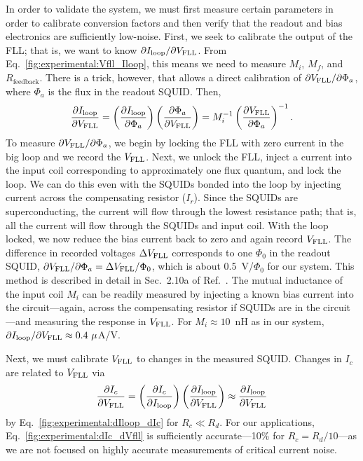 In order to validate the system, we must first measure certain parameters in order to calibrate conversion factors and then verify that the readout and bias electronics are sufficiently low-noise. First, we seek to calibrate the output of the FLL; that is, we want to know $\partial I_\text{loop}/\partial V_\text{FLL}$. From Eq.~\eqref{fig:experimental:Vfll_Iloop}, this means we need to measure $M_i$, $M_f$, and $R_{\text{feedback}}$. There is a trick, however, that allows a direct calibration of $\partial V_\text{FLL}/\partial\Phi_a$, where $\Phi_a$ is the flux in the readout SQUID. Then,
\begin{align}\label{fig:experimental:dIloop_dVfll}
\frac{\partial\Iloop}{\partial\Vfll} = \left(\frac{\partial\Iloop}{\partial\Phi_a}\right) \left(\frac{\partial\Phi_a}{\partial\Vfll}\right) %
= M_i^{-1} \left(\frac{\partial\Vfll}{\partial\Phi_a}\right)^{-1}.
\end{align}
To measure $\partial V_\text{FLL}/\partial\Phi_a$, we begin by locking the FLL with zero current in the big loop and we record the $V_\text{FLL}$. Next, we unlock the FLL, inject a current into the input coil corresponding to approximately one flux quantum, and lock the loop. We can do this even with the SQUIDs bonded into the loop by injecting current across the compensating resistor ($I_r$). Since the SQUIDs are superconducting, the current will flow through the lowest resistance path; that is, all the current will flow through the SQUIDs and input coil. With the loop locked, we now reduce the bias current back to zero and again record $V_\text{FLL}$. The difference in recorded voltages $\Delta V_\text{FLL}$ corresponds to one $\Phi_0$ in the readout SQUID, $\partial V_\text{FLL}/\partial\Phi_a = \Delta V_\text{FLL} / \Phi_0$, which is about 0.5~V/$\Phi_0$ for our system. This method is described in detail in Sec.~2.10a of Ref.~\citep{Wellstood:thesis}. The mutual inductance of the input coil $M_i$ can be readily measured by injecting a known bias current into the circuit---again, across the compensating resistor if SQUIDs are in the circuit---and measuring the response in $V_\text{FLL}$. For $M_i \approx 10$~nH as in our system, $\partial I_\text{loop}/\partial V_\text{FLL} \approx 0.4~\mu$A/V.

Next, we must calibrate $V_\text{FLL}$ to changes in the measured SQUID. Changes in $I_c$ are related to $V_\text{FLL}$ via
\begin{align}\label{fig:experimental:dIc_dVfll}
\frac{\partial I_c}{\partial\Vfll} = \left(\frac{\partial I_c}{\partial\Iloop}\right) \left(\frac{\partial\Iloop}{\partial\Vfll}\right) %
\approx \frac{\partial\Iloop}{\partial\Vfll}
\end{align}
by Eq.~\eqref{fig:experimental:dIloop_dIc} for $R_c \ll R_d$. For our applications, Eq.~\eqref{fig:experimental:dIc_dVfll} is sufficiently accurate---10\% for $R_c = R_d/10$---as we are not focused on highly accurate measurements of critical current noise.

